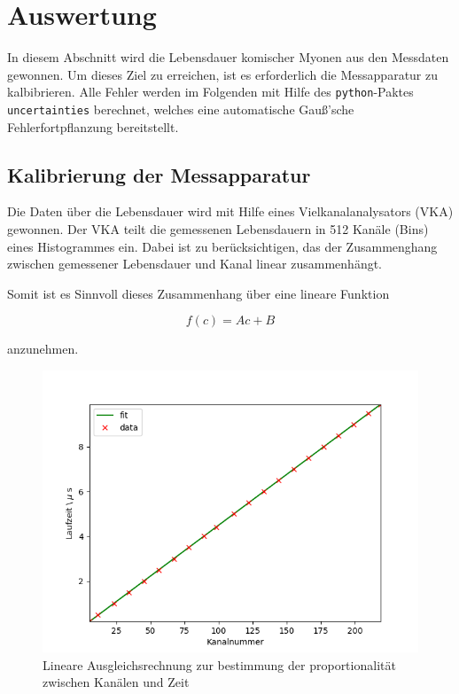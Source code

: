 \section{Auswertung}
\label{sec:evaluation}
In diesem Abschnitt wird die Lebensdauer komischer Myonen aus den Messdaten gewonnen.
Um dieses Ziel zu erreichen, ist es erforderlich die Messapparatur zu kalbibrieren.
Alle Fehler werden im Folgenden mit Hilfe
des \texttt{python}-Paktes \texttt{uncertainties} \cite{uncertain} berechnet, welches eine automatische
Gauß'sche Fehlerfortpflanzung bereitstellt.

\subsection{Kalibrierung der Messapparatur}
\label{subsec:calibration}
Die Daten über die Lebensdauer wird mit Hilfe eines Vielkanalanalysators (VKA) gewonnen.
Der VKA teilt die gemessenen Lebensdauern in \num{512} Kanäle (Bins) eines Histogrammes ein.
Dabei ist zu berücksichtigen, das der Zusammenghang zwischen gemessener Lebensdauer und
Kanal linear zusammenhängt.

\noindent Somit ist es Sinnvoll dieses Zusammenhang über eine lineare Funktion

\begin{equation}
f(c) = Ac + B
\end{equation}

\noindent anzunehmen.

\begin{figure}
	\centering
	\includegraphics[width=\textwidth]{img/calib.png}
	\caption{Lineare Ausgleichsrechnung zur bestimmung der proportionalität zwischen Kanälen und Zeit}
	\label{abb:cal}
\end{figure}


